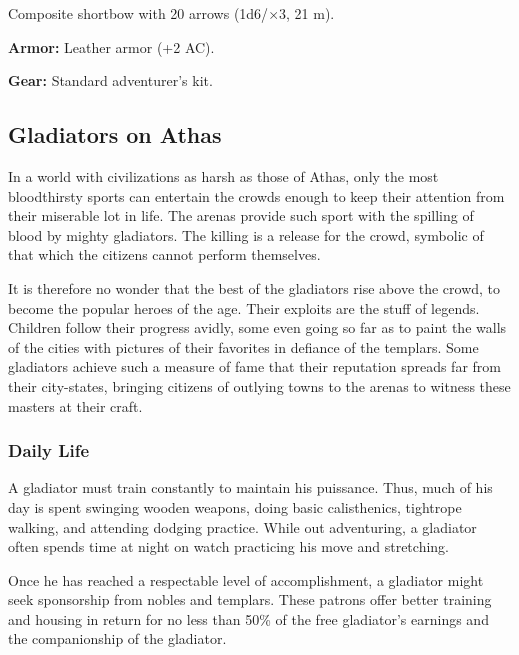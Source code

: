 Composite shortbow with 20 arrows (1d6/$\times$3, 21 m).

\textbf{Armor:} Leather armor (+2 AC).

\textbf{Gear:} Standard adventurer's kit.

\subsection{Gladiators on Athas}

In a world with civilizations as harsh as those of Athas, only the most bloodthirsty sports can entertain the crowds enough to keep their attention from their miserable lot in life. The arenas provide such sport with the spilling of blood by mighty gladiators. The killing is a release for the crowd, symbolic of that which the citizens cannot perform themselves.

It is therefore no wonder that the best of the gladiators rise above the crowd, to become the popular heroes of the age. Their exploits are the stuff of legends. Children follow their progress avidly, some even going so far as to paint the walls of the cities with pictures of their favorites in defiance of the templars. Some gladiators achieve such a measure of fame that their reputation spreads far from their city-states, bringing citizens of outlying towns to the arenas to witness these masters at their craft.

\subsubsection{Daily Life}

A gladiator must train constantly to maintain his puissance. Thus, much of his day is spent swinging wooden weapons, doing basic calisthenics, tightrope walking, and attending dodging practice. While out adventuring, a gladiator often spends time at night on watch practicing his move and stretching.

Once he has reached a respectable level of accomplishment, a gladiator might seek sponsorship from nobles and templars. These patrons offer better training and housing in return for no less than 50\% of the free gladiator's earnings and the companionship of the gladiator.

